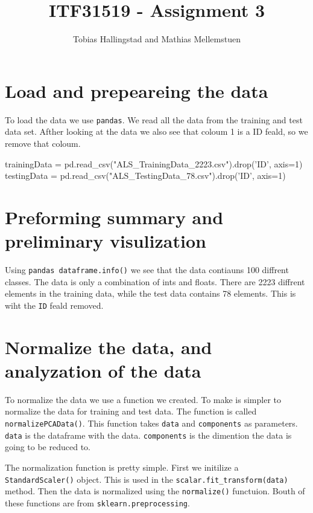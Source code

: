 \documentclass[10pt]{article}
\title{ITF31519 - Assignment 3}
\author{Tobias Hallingstad and Mathias Mellemstuen}
\begin{document}
    \begin{titlepage}
        \maketitle
    \end{titlepage}


    \section{Load and prepeareing the data}
    To load the data we use \texttt{pandas}. We read all the data from the training and test data set. Afther looking at the data we also see that coloum 1 is a ID feald, so we remove that coloum.

    \begin{pythoncode}
    trainingData = pd.read_csv("ALS_TrainingData_2223.csv").drop('ID', axis=1)
    testingData = pd.read_csv("ALS_TestingData_78.csv").drop('ID', axis=1)
    \end{pythoncode}

    \section{Preforming summary and preliminary visulization}
    Using \texttt{pandas dataframe.info()} we see that the data contiauns 100 diffrent classes. The data is only a combination of ints and floats. There are 2223 diffrent elements in the training data, while the test data contains 78 elements. This is wiht the \texttt{ID} feald removed. 

    \section{Normalize the data, and analyzation of the data}
    To normalize the data we use a function we created. To make is simpler to normalize the data for training and test data. The function is called \texttt{normalizePCAData()}. This function takes \texttt{data} and \texttt{components} as parameters. \texttt{data} is the dataframe with the data. \texttt{components} is the dimention the data is going to be reduced to.

    The normalization function is pretty simple. First we initilize a \texttt{StandardScaler()} object. This is used in the \texttt{scalar.fit\_transform(data)} method. Then the data is normalized using the \texttt{normalize()} functuion. Bouth of these functions are from \texttt{sklearn.preprocessing}.
\end{document}
